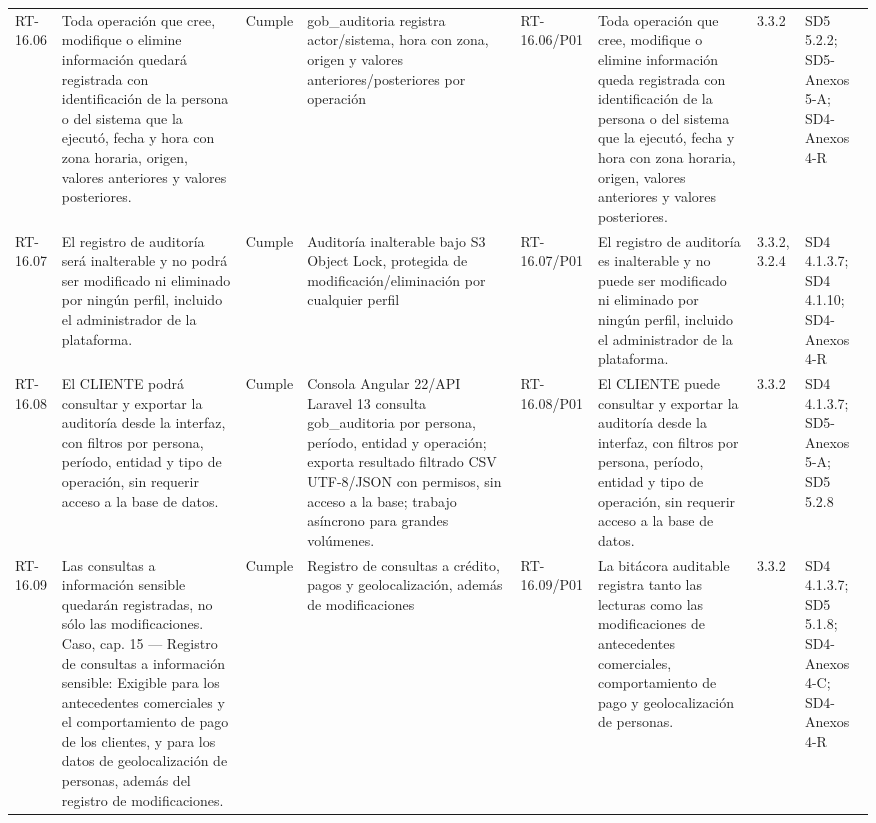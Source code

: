 \documentclass[oficio,firma,final]{lafrox}
\begin{document}
\begin{landscape}
{\begin{longtable}{@{}F{0.054} F{0.173} F{0.061} F{0.191} F{0.106} F{0.180} F{0.067} F{0.168}@{}}
  RT-16.06 & Toda operación que cree, modifique o elimine información quedará registrada con identificación de la persona o del sistema que la ejecutó, fecha y hora con zona horaria, origen, valores anteriores y valores posteriores. & Cumple & gob\_auditoria registra actor/sistema, hora con zona, origen y valores anteriores/posteriores por operación & RT-16.06/\allowbreak{}P01 & Toda operación que cree, modifique o elimine información queda registrada con identificación de la persona o del sistema que la ejecutó, fecha y hora con zona horaria, origen, valores anteriores y valores posteriores. & 3.3.2 & SD5 5.2.2; SD5-Anexos 5-A; SD4-Anexos 4-R  \\
  RT-16.07 & El registro de auditoría será inalterable y no podrá ser modificado ni eliminado por ningún perfil, incluido el administrador de la plataforma. & Cumple & Auditoría inalterable bajo S3 Object Lock, protegida de modificación/eliminación por cualquier perfil & RT-16.07/\allowbreak{}P01 & El registro de auditoría es inalterable y no puede ser modificado ni eliminado por ningún perfil, incluido el administrador de la plataforma. & 3.3.2, 3.2.4 & SD4 4.1.3.7; SD4 4.1.10; SD4-Anexos 4-R  \\
  RT-16.08 & El CLIENTE podrá consultar y exportar la auditoría desde la interfaz, con filtros por persona, período, entidad y tipo de operación, sin requerir acceso a la base de datos. & Cumple & Consola Angular 22/API Laravel 13 consulta gob\_auditoria por persona, período, entidad y operación; exporta resultado filtrado CSV UTF-8/JSON con permisos, sin acceso a la base; trabajo asíncrono para grandes volúmenes. & RT-16.08/\allowbreak{}P01 & El CLIENTE puede consultar y exportar la auditoría desde la interfaz, con filtros por persona, período, entidad y tipo de operación, sin requerir acceso a la base de datos. & 3.3.2 & SD4 4.1.3.7; SD5-Anexos 5-A; SD5 5.2.8  \\
  RT-16.09 & Las consultas a información sensible quedarán registradas, no sólo las modificaciones. Caso, cap. 15 — Registro de consultas a información sensible: Exigible para los antecedentes comerciales y el comportamiento de pago de los clientes, y para los datos de geolocalización de personas, además del registro de modificaciones. & Cumple & Registro de consultas a crédito, pagos y geolocalización, además de modificaciones & RT-16.09/\allowbreak{}P01 & La bitácora auditable registra tanto las lecturas como las modificaciones de antecedentes comerciales, comportamiento de pago y geolocalización de personas. & 3.3.2 & SD4 4.1.3.7; SD5 5.1.8; SD4-Anexos 4-C; SD4-Anexos 4-R  \\

\end{longtable}}
\end{landscape}
\end{document}
